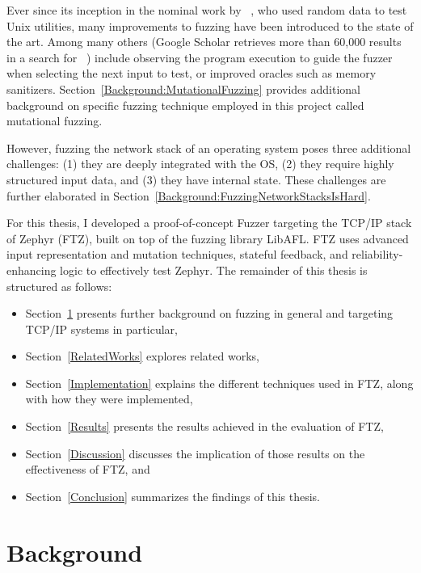 \documentclass{article}
\newcommand{\proj}{FTZ\xspace}
\let\savedCite=\cite
\renewcommand{\cite}{\unskip~\savedCite}
\begin{document}
\begin{multicols}{2}
  Ever since its inception in the nominal work by \citeauthor{UNIX}\cite{UNIX}, who used random data to test Unix utilities, many improvements to fuzzing have been introduced to the state of the art. Among many others (Google Scholar retrieves more than 60,000 results in a search for \cite{GoogleScholarFuzzing}) include observing the program execution to guide the fuzzer when selecting the next input to test, or improved oracles such as memory sanitizers. Section~\ref{Background:MutationalFuzzing} provides additional background on specific fuzzing technique employed in this project called mutational fuzzing.

  However, fuzzing the network stack of an operating system poses three additional challenges: (1) they are deeply integrated with the OS, (2) they require highly structured input data, and (3) they have internal state. These challenges are further elaborated in Section~\ref{Background:FuzzingNetworkStacksIsHard}.

  For this thesis, I developed a proof-of-concept Fuzzer targeting the TCP/IP stack of Zephyr (\proj), built on top of the fuzzing library LibAFL. \proj uses advanced input representation and mutation techniques, stateful feedback, and reliability-enhancing logic to effectively test Zephyr. The remainder of this thesis is structured as follows:

  \begin{itemize}
    \item Section~\ref{Background} presents further background on fuzzing in general and targeting TCP/IP systems in particular,
    \item Section~\ref{RelatedWorks} explores related works,
    \item Section~\ref{Implementation} explains the different techniques used in \proj, along with how they were implemented,
    \item Section~\ref{Results} presents the results achieved in the evaluation of \proj,
    \item Section~\ref{Discussion} discusses the implication of those results on the effectiveness of \proj, and
    \item Section~\ref{Conclusion} summarizes the findings of this thesis.
  \end{itemize}


  \section{Background}
  \label{Background}


\end{multicols}
\end{document}
